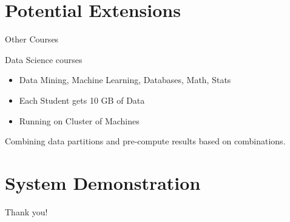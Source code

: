 \documentclass[9pt]{beamer}
\begin{document}


\section{Potential Extensions}




\begin{frame}[fragile]{Other Courses }

Data Science courses 

\begin{itemize}

  \item Data Mining, Machine Learning, Databases, Math, Stats   
\end{itemize}



\begin{itemize}
  \item Each Student gets 10 GB of Data 
  \item Running on Cluster of Machines  
\end{itemize}
 
  Combining data partitions and pre-compute results based on combinations.  
 


\end{frame}


\section{System Demonstration}



\begin{frame}[fragile]{}

\centering
\Huge 
Thank you!

\end{frame}
\end{document}
